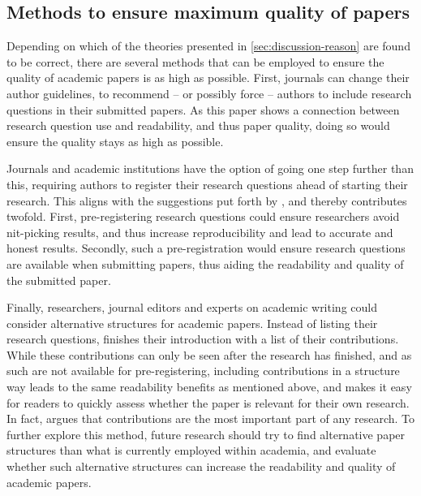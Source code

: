 \subsection{Methods to ensure maximum quality of papers}
Depending on which of the theories presented in \autoref{sec:discussion-reason} are found to be correct, there are several methods that can be employed to ensure the quality of academic papers is as high as possible. First, journals can change their author guidelines, to recommend -- or possibly force -- authors to include research questions in their submitted papers. As this paper shows a connection between research question use and readability, and thus paper quality, doing so would ensure the quality stays as high as possible.

Journals and academic institutions have the option of going one step further than this, requiring authors to register their research questions ahead of starting their research. This aligns with the suggestions put forth by \textcite{Baker_2016}, and thereby contributes twofold. First, pre-registering research questions could ensure researchers avoid nit-picking results, and thus increase reproducibility and lead to accurate and honest results. Secondly, such a pre-registration would ensure research questions are available when submitting papers, thus aiding the readability and quality of the submitted paper.

Finally, researchers, journal editors and experts on academic writing could consider alternative structures for academic papers. Instead of listing their research questions, \textcite{Barredo_2020} finishes their introduction with a list of their contributions. While these contributions can only be seen after the research has finished, and as such are not available for pre-registering, including contributions in a structure way leads to the same readability benefits as mentioned above, and makes it easy for readers to quickly assess whether the paper is relevant for their own research. In fact, \textcite{Chen_2022} argues that contributions are the most important part of any research. To further explore this method, future research should try to find alternative paper structures than what is currently employed within academia, and evaluate whether such alternative structures can increase the readability and quality of academic papers.


